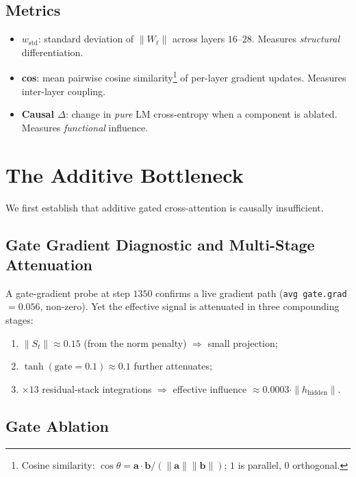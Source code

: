 \documentclass[11pt,a4paper]{article}
\newcommand{\St}{S_t}
\newcommand{\wstd}{w_{\mathrm{std}}}
\begin{document}
\subsection{Metrics}

\begin{itemize}
  \item $\wstd$: standard deviation of $\|W_\ell\|$ across layers $16$--$28$.
    Measures \emph{structural} differentiation.
  \item \textbf{cos}: mean pairwise cosine similarity\footnote{Cosine similarity:
    $\cos\theta = \mathbf{a}\cdot\mathbf{b}/(\|\mathbf{a}\|\|\mathbf{b}\|)$; $1$ is
    parallel, $0$ orthogonal.} of per-layer gradient updates. Measures inter-layer
    coupling.
  \item \textbf{Causal $\Delta$}: change in \emph{pure} LM cross-entropy when a
    component is ablated. Measures \emph{functional} influence.
\end{itemize}

\section{The Additive Bottleneck}

We first establish that additive gated cross-attention is causally insufficient.

\subsection{Gate Gradient Diagnostic and Multi-Stage Attenuation}

A gate-gradient probe at step $1350$ confirms a live gradient path
(\texttt{avg gate.grad} $= 0.056$, non-zero). Yet the effective signal is attenuated
in three compounding stages:

\begin{enumerate}
  \item $\|\St\| \approx 0.15$ (from the norm penalty) $\Rightarrow$ small projection;
  \item $\tanh(\mathrm{gate}=0.1) \approx 0.1$ further attenuates;
  \item $\times 13$ residual-stack integrations $\Rightarrow$ effective influence
    $\approx 0.0003\cdot\|h_{\mathrm{hidden}}\|$.
\end{enumerate}

\subsection{Gate Ablation}
\end{document}
